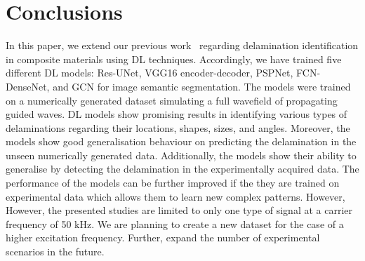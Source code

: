\section{Conclusions}
\label{conclusion}
In this paper, we extend our previous work~\cite{Ijjeh2021} regarding delamination identification in composite materials using DL techniques. 
Accordingly, we have trained five different DL models: Res-UNet, VGG16 encoder-decoder, PSPNet, FCN-DenseNet, and GCN for image semantic segmentation.
The models were trained on a numerically generated dataset simulating a full wavefield of propagating guided waves.
DL models show promising results in identifying various types of delaminations regarding their locations, shapes, sizes, and angles. 
Moreover, the models show good generalisation behaviour on predicting the delamination in the unseen numerically generated data.
Additionally, the models show their ability to generalise by detecting the delamination in the experimentally acquired data.
The performance of the models can be further improved if the they are trained on experimental data which allows them to learn new complex patterns.
However, However, the presented studies are limited to only one type of signal at a carrier frequency of 50 kHz. 
We are planning to create a new dataset for the case of a higher excitation frequency. 
Further, expand the number of experimental scenarios in the future.